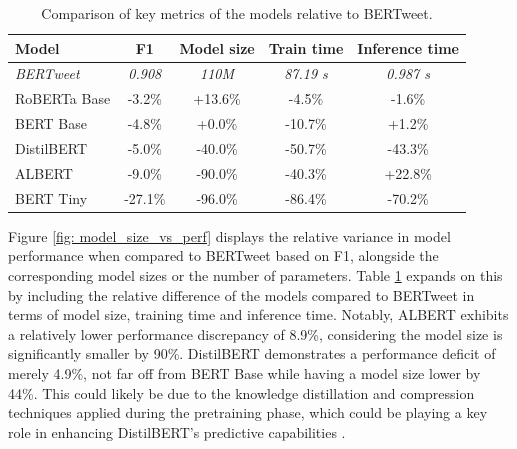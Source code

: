 \begin{table}
    \small
    \centering
    \begin{tabularx}{\textwidth}{|X|c|c|c|c|}
        \hline
        \rowcolor[gray]{0.7}
        \textbf{Model} & \textbf{F1} & \textbf{Model size} & \textbf{Train time} & \textbf{Inference time} \\
        \hline
        \textit{BERTweet}       & \textit{0.908}       & \textit{110M}                & \textit{87.19 s}             & \textit{0.987 s}                 \\
        \hline
        RoBERTa Base   & -3.2\%      & +13.6\%             & -4.5\%              & -1.6\%                  \\
        \rowcolor[gray]{0.9}
        BERT Base      & -4.8\%      & +0.0\%              & -10.7\%             & +1.2\%                  \\
        DistilBERT     & -5.0\%      & -40.0\%             & -50.7\%             & -43.3\%                 \\
        \rowcolor[gray]{0.9}
        ALBERT         & -9.0\%      & -90.0\%             & -40.3\%             & +22.8\%                 \\
        BERT Tiny      & -27.1\%     & -96.0\%             & -86.4\%             & -70.2\%                 \\
        \hline
    \end{tabularx}
    \caption{Comparison of key metrics of the models relative to BERTweet.}
    \label{tab: relative_comparison_metrics}
\end{table}

Figure \ref{fig: model_size_vs_perf} displays the relative variance in model performance when compared to BERTweet based on F1, alongside the corresponding model sizes or the number of parameters. Table \ref{tab: relative_comparison_metrics} expands on this by including the relative difference of the models compared to BERTweet in terms of model size, training time and inference time. Notably, ALBERT exhibits a relatively lower performance discrepancy of 8.9\%, considering the model size is significantly smaller by 90\%. DistilBERT demonstrates a performance deficit of merely 4.9\%, not far off from BERT Base while having a model size lower by 44\%. This could likely be due to the knowledge distillation and compression techniques applied during the pretraining phase, which could be playing a key role in enhancing DistilBERT's predictive capabilities \cite{sanhDistilBERTDistilledVersion2020}.\\

